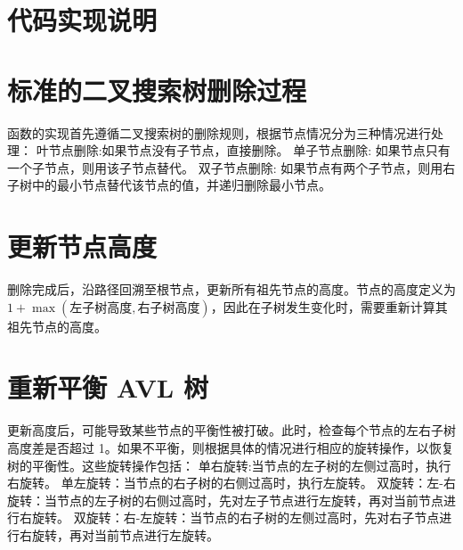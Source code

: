 \documentclass[UTF8]{ctexart}
\begin{document}
\pagestyle{fancy}
\fancyhead{}

\section{代码实现说明}
\section{标准的二叉搜索树删除过程}
函数的实现首先遵循二叉搜索树的删除规则，根据节点情况分为三种情况进行处理：
   叶节点删除:如果节点没有子节点，直接删除。
   单子节点删除: 如果节点只有一个子节点，则用该子节点替代。
   双子节点删除: 如果节点有两个子节点，则用右子树中的最小节点替代该节点的值，并递归删除最小节点。

\section{更新节点高度}
删除完成后，沿路径回溯至根节点，更新所有祖先节点的高度。节点的高度定义为 $1 + \max(\text{左子树高度}, \text{右子树高度})$，因此在子树发生变化时，需要重新计算其祖先节点的高度。
\section{重新平衡 AVL 树}
更新高度后，可能导致某些节点的平衡性被打破。此时，检查每个节点的左右子树高度差是否超过 1。如果不平衡，则根据具体的情况进行相应的旋转操作，以恢复树的平衡性。这些旋转操作包括：
    单右旋转:当节点的左子树的左侧过高时，执行右旋转。
    单左旋转：当节点的右子树的右侧过高时，执行左旋转。
    双旋转：左-右旋转：当节点的左子树的右侧过高时，先对左子节点进行左旋转，再对当前节点进行右旋转。
    双旋转：右-左旋转：当节点的右子树的左侧过高时，先对右子节点进行右旋转，再对当前节点进行左旋转。
\end{document}
